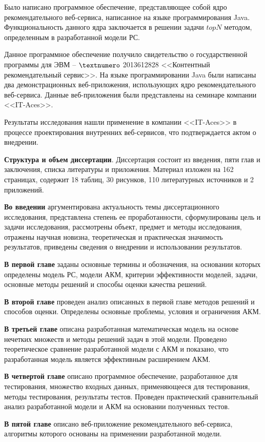 Было написано программное обеспечение, представляющее собой ядро
рекомендательного веб-сервиса, написанное на языке программирования Java.
Функциональность данного ядра заключается в решении задачи $topN$
методом, определенным в разработанной модели РС.

Данное программное обеспечение получило свидетельство
о государственной программы для ЭВМ – $\textnumero$ 2013612828 <<Контентный
рекомендательный сервис>>. На языке программировании Java были написаны
два демонстрационных веб-приложения, использующих ядро рекомендательного
веб-сервиса. Данные веб-приложения были представлены на семинаре компании <<IT-Aces>>.

Результаты исследования нашли применение в компании
<<IT-Aces>> в процессе проектирования внутренних веб-сервисов, что
подтверждается актом о внедрении.

{\bf Структура и объем диссертации}. Диссертация состоит из введения, пяти глав
и заключения, списка литературы и приложения. Материал изложен на 162
страницах, содержит 18 таблиц, 30 рисунков, 110 литературных источников и 2
приложений.

{\bf Во  введении} аргументирована  актуальность  темы  диссертационного
исследования, представлена степень ее проработанности, сформулированы цель и
задачи  исследования,  рассмотрены  объект,  предмет  и  методы  исследования,
отражены научная новизна, теоретическая и практическая значимость результатов,
приведены сведения о внедрении и использовании результатов.

{\bf В первой главе} заданы основные термины и обозначения, на основании
которых определены модель РС, модели АКМ, критерии эффективности
моделей, задачи, основные методы решений и способы оценки качества решений.

{\bf В второй главе} проведен анализ описанных в первой главе методов решений
и способов оценки. Определены основные проблемы, условия и ограничения АКМ.

{\bf В третьей главе} описана разработанная математическая модель на основе
нечетких множеств и методы решений задач в этой модели. Проведено теоретическое
сравнение разработанной модели с АКМ и показано, что разработанная модель
является эффективным расширением АКМ.


{\bf В четвертой главе} описано программное обеспечение, разработанное для
тестирования, множество входных данных, применяющееся для
тестирования, методы тестирования, результаты тестов. Проведен практический
сравнительный анализ разработанной модели и АКМ на основании полученных тестов.

{\bf В пятой главе} описано веб-приложение рекомендательного веб-сервиса,
алгоритмы которого основаны на применении разработанной модели.

\hfill \break

